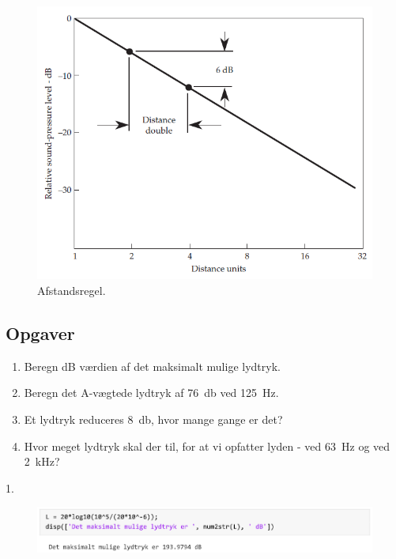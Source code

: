 \begin{figure} [H]
	\centering
	\includegraphics[width=0.85\linewidth]{graphics/10.png}
	\caption{Afstandsregel.}
	\label{fig:10}
\end{figure}

\newpage
\subsection{Opgaver}

\begin{enumerate}
	\item Beregn dB værdien af det maksimalt mulige lydtryk.
	\item Beregn det A-vægtede lydtryk af \SI{76}{\decibel} ved \SI{125}{\hertz}.
	\item Et lydtryk reduceres \SI{8}{\decibel}, hvor mange gange er det?
	\item Hvor meget lydtryk skal der til, for at vi opfatter lyden - ved \SI{63}{\hertz} og ved \SI{2}{\kilo\hertz}?
\end{enumerate}

1.
\begin{figure} [H]
	\includegraphics[width=\linewidth]{graphics/36.png}
\end{figure}

